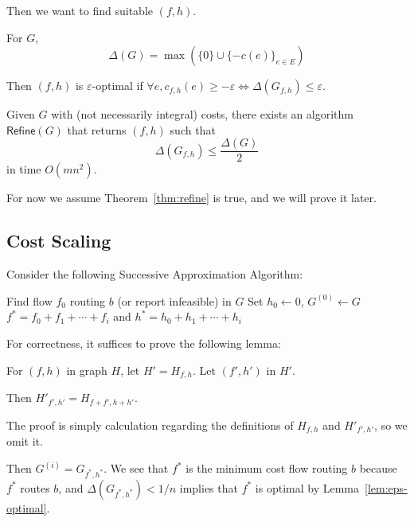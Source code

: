 Then we want to find suitable $(f,h)$.

\begin{definition}
	For $G$,
	\[ \Delta(G) = \max(\{0\}\cup\{-c(e)\}_{e \in E}) \]

	Then $(f,h)$ is $\varepsilon$-optimal if $\forall e, c_{f,h}(e) \geq -\varepsilon \iff \Delta(G_{f,h}) \leq \varepsilon$.

\end{definition}

\begin{theorem} \label{thm:refine}
	Given $G$ with (not necessarily integral) costs, there exists an algorithm $\mathsf{Refine}(G)$ that returns $(f,h)$ such that
	\[ \Delta(G_{f,h}) \leq \frac{\Delta(G)}{2}\]
	in time $O(mn^2)$.
\end{theorem}

For now we assume Theorem~\ref{thm:refine} is true, and we will prove it later.

\subsection{Cost Scaling}

Consider the following Successive Approximation Algorithm:

\begin{algorithm}[H]
	\caption{Successive Approximation}
	\label{alg:successive-approximation}
	Find flow $f_0$ routing $b$ (or report infeasible) in $G$\;
	Set $h_0\gets 0$, $G^{(0)} \gets G$\;
	\Return $f^* = f_0 + f_1 + \cdots + f_i$ and $h^* = h_0+h_1+\cdots+h_i$\;
\end{algorithm}

For correctness, it suffices to prove the following lemma:
\begin{lemma}
	For $(f,h)$ in graph $H$, let $H' = H_{f,h}$.
	Let $(f',h')$ in $H'$.

	Then $H'_{f',h'} = H_{f+f',h+h'}$.
\end{lemma}

The proof is simply calculation regarding the definitions of $H_{f,h}$ and $H'_{f',h'}$, so we omit it.

Then $G^{(i)} = G_{f^*,h^*}$. We see that $f^*$ is the minimum cost flow routing $b$ because $f^*$ routes $b$, and $\Delta(G_{f^*,h^*}) < 1/n$ implies that $f^*$ is optimal by Lemma~\ref{lem:eps-optimal}.

